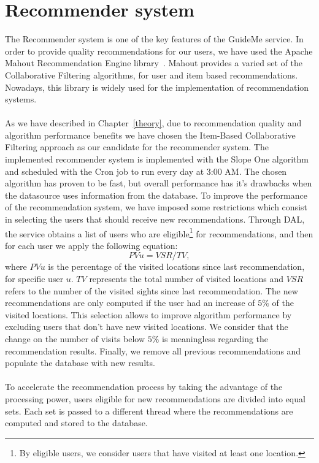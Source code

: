 \section{Recommender system}
\label{sec:recommenderService}
The Recommender system is one of the key features of the GuideMe service. In order to provide quality recommendations for our users, we have used the Apache Mahout Recommendation Engine library~\cite{apacheMahout}. Mahout provides a varied set of the Collaborative Filtering algorithms, for user and item based recommendations. Nowadays, this library is widely used for the implementation of recommendation systems.\\
\\
As we have described in Chapter~\ref{theory}, due to recommendation quality and algorithm performance benefits we have chosen the Item-Based Collaborative Filtering approach as our candidate for the recommender system. The implemented recommender system is implemented with the Slope One algorithm and scheduled with the Cron job to run every day at 3:00 AM. The chosen algorithm has proven to be fast, but overall performance has it's drawbacks when the datasource uses information from the database. To improve the performance of the recommendation system, we have imposed some restrictions which consist in selecting the users that should receive new recommendations. Through DAL, the service obtains a list of users who are eligible\footnote{By eligible users, we consider users that have visited at least one location.} for recommendations, and then for each user we apply the following equation:\\
\begin{equation}
PVu = VSR/TV,
\end{equation}
where $PVu$ is the percentage of the visited locations since last recommendation, for specific user $u$. $TV$ represents the total number of visited locations and $VSR$ refers to the number of the visited sights since last recommendation. The new recommendations are only computed if the user had an increase of $5\%$ of the visited locations. This selection allows to improve algorithm performance by excluding users that don't have new visited locations. We consider that the change on the number of visits below $5\%$ is meaningless regarding the recommendation results. Finally, we remove all previous recommendations and populate the database with new results.\\
\\
To accelerate the recommendation process by taking the advantage of the processing power, users eligible for new recommendations are divided into equal sets. Each set is passed to a different thread where the recommendations are computed and stored to the database.

